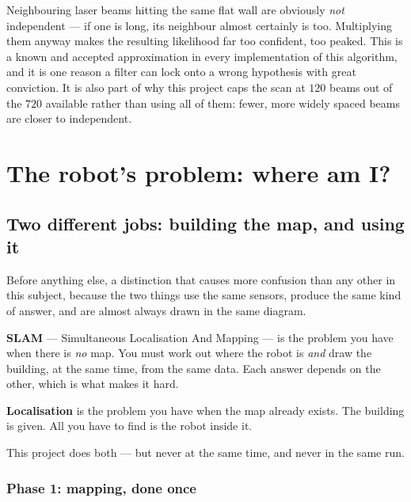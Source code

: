 \documentclass[11pt,a4paper]{report}
\begin{document}
\begin{warnbox}
Neighbouring laser beams hitting the same flat wall are obviously \emph{not}
independent --- if one is long, its neighbour almost certainly is too.
Multiplying them anyway makes the resulting likelihood far too confident, too
peaked. This is a known and accepted approximation in every implementation of
this algorithm, and it is one reason a filter can lock onto a wrong hypothesis
with great conviction. It is also part of why this project caps the scan at
$120$ beams out of the $720$ available rather than using all of them: fewer,
more widely spaced beams are closer to independent.
\end{warnbox}

\chapter{The robot's problem: where am I?}
\label{ch:where}

\section{Two different jobs: building the map, and using it}
\label{sec:slam-vs-amcl}

Before anything else, a distinction that causes more confusion than any other
in this subject, because the two things use the same sensors, produce the same
kind of answer, and are almost always drawn in the same diagram.

\begin{keyidea}
\textbf{SLAM} --- Simultaneous Localisation And Mapping --- is the problem you
have when there is \emph{no} map. You must work out where the robot is
\emph{and} draw the building, at the same time, from the same data. Each
answer depends on the other, which is what makes it hard.

\textbf{Localisation} is the problem you have when the map already exists. The
building is given. All you have to find is the robot inside it.

This project does both --- but never at the same time, and never in the same
run.
\end{keyidea}

\subsection{Phase 1: mapping, done once}
\end{document}

